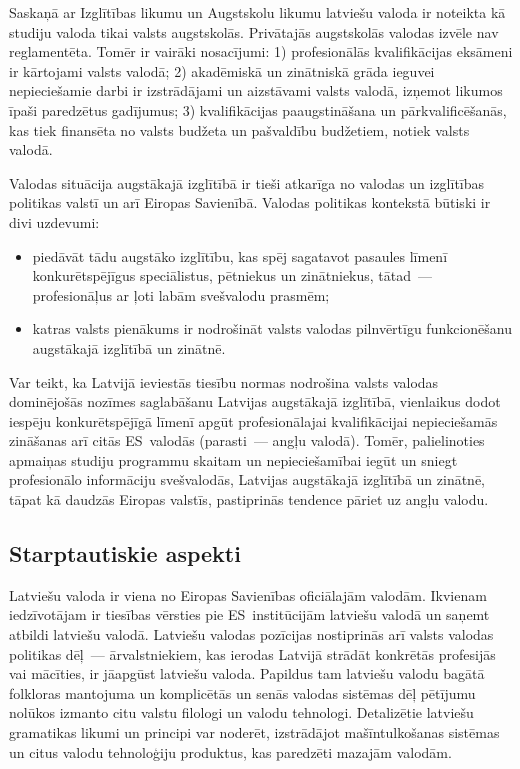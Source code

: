 \begin{multicols}{2}
Saskaņā ar Izglītības likumu un Augstskolu likumu latviešu valoda ir noteikta kā studiju valoda tikai valsts augstskolās.
Privātajās augstskolās valodas izvēle nav reglamentēta.
Tomēr ir vairāki nosacījumi: 1) profesionālās kvalifikācijas eksāmeni ir kārtojami valsts valodā; 2) akadēmiskā un zinātniskā grāda ieguvei nepieciešamie darbi ir izstrādājami un aizstāvami valsts valodā, izņemot likumos īpaši paredzētus gadījumus; 3) kvalifikācijas paaugstināšana un pārkvalificēšanās, kas tiek finansēta no valsts budžeta un pašvaldību budžetiem, notiek valsts valodā.

Valodas situācija augstākajā izglītībā ir tieši atkarīga no valodas un izglītības politikas valstī un arī Eiropas Savienībā.
Valodas politikas kontekstā būtiski ir divi uzdevumi:

\begin{itemize}
\item  piedāvāt tādu augstāko izglītību, kas spēj sagatavot pasaules līmenī konkurētspējīgus speciālistus, pētniekus un zinātniekus, tātad~--- profesionāļus ar ļoti labām svešvalodu prasmēm;
\item katras valsts pienākums ir nodrošināt valsts valodas pilnvērtīgu funkcionēšanu augstākajā izglītībā un zinātnē.
\end{itemize}

Var teikt, ka Latvijā ieviestās tiesību normas nodrošina valsts valodas dominējošās nozīmes saglabāšanu Latvijas augstākajā izglītībā, vienlaikus dodot iespēju konkurētspējīgā līmenī apgūt profesionālajai kvalifikācijai nepieciešamās zināšanas arī citās ES~valodās (parasti~--- angļu valodā).
Tomēr, palielinoties apmaiņas studiju programmu skaitam un nepieciešamībai iegūt un sniegt profesionālo informāciju svešvalodās, Latvijas augstākajā izglītībā un zinātnē, tāpat kā daudzās Eiropas valstīs, pastiprinās tendence pāriet uz angļu valodu. 

\subsection{Starptautiskie aspekti}

Latviešu valoda ir viena no Eiropas Savienības oficiālajām valodām.
Ikvienam iedzīvotājam ir tiesības vērsties pie ES~institūcijām latviešu valodā un saņemt atbildi latviešu valodā.
Latviešu valodas pozīcijas nostiprinās arī valsts valodas politikas dēļ~--- ārvalstniekiem, kas ierodas Latvijā strādāt konkrētās profesijās vai mācīties, ir jāapgūst latviešu valoda.
Papildus tam latviešu valodu bagātā folkloras mantojuma un komplicētās un senās valodas sistēmas dēļ pētījumu nolūkos izmanto citu valstu filologi un valodu tehnologi.
Detalizētie latviešu gramatikas likumi un principi var noderēt, izstrādājot mašīntulkošanas sistēmas un citus valodu tehnoloģiju produktus, kas paredzēti mazajām valodām. 


\end{multicols}
